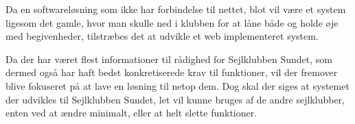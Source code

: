 Da en softwareløsning som ikke har forbindelse til nettet, blot vil være et system ligesom det gamle, hvor man skulle
ned i klubben for at låne både og holde øje med begivenheder, tilstræbes det at udvikle et web implementeret system.

Da der har været flest informationer til rådighed for Sejlklubben Sundet, som dermed også har haft bedst konkretiserede
krav til funktioner, vil der fremover blive fokuseret på at lave en løsning til netop dem. Dog skal der siges at
systemet der udvikles til Sejlklubben Sundet, let vil kunne bruges af de andre sejlklubber, enten ved at ændre minimalt,
eller at helt slette funktioner.





